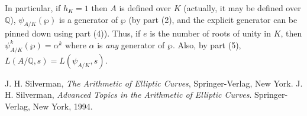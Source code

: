\documentclass[12pt]{article}
\theoremstyle{definition}
\newcommand{\Rats}{\mathbb{Q}}
\begin{document}
In particular, if $h_K=1$ then $A$ is defined over $K$ (actually,
it may be defined over $\Rats$), $\psi_{A/K}(\wp)$ is a generator
of $\wp$ (by part (2), and the explicit generator can be pinned
down using part (4)). Thus, if $e$ is the number of roots of unity
in $K$, then $\psi_{A/K}^k(\wp)=\alpha^k$ where $\alpha$ is {\it
any} generator of $\wp$. Also, by part (5),
$L(A/\Rats,s)=L(\psi_{A/K},s)$.

\begin{thebibliography}{00}
 J. H. Silverman, {\em The Arithmetic of
Elliptic Curves}, Springer-Verlag, New York.
 J. H. Silverman, {\em Advanced Topics in
the Arithmetic of Elliptic Curves}. Springer-Verlag, New York,
1994.


\end{thebibliography}
\end{document}

